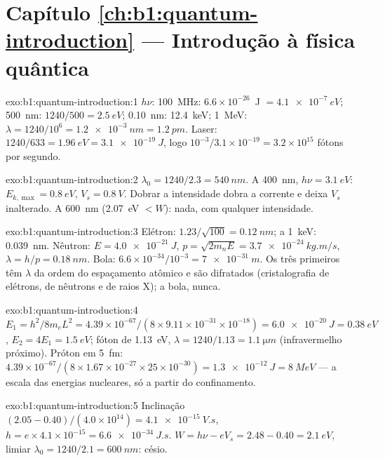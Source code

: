 \section*{Capítulo \ref{ch:b1:quantum-introduction} --- Introdução à física quântica}

\begin{solution}{exo:b1:quantum-introduction:1}
$h\nu$: \qty{100}{MHz}: $6.6 \times 10^{-26}$~J $= \qty{4.1e-7}{eV}$; \qty{500}{nm}:
$1240/500 = \qty{2.5}{eV}$; \qty{0.10}{nm}: \qty{12.4}{keV}; \qty{1}{MeV}: $\lambda =
1240/10^6 = \qty{1.2e-3}{nm} = \qty{1.2}{pm}$. Laser: $1240/633 = \qty{1.96}{eV} =
\qty{3.1e-19}{J}$, logo $10^{-3}/3.1 \times 10^{-19} = 3.2 \times 10^{15}$ fótons por
segundo.
\end{solution}

\begin{solution}{exo:b1:quantum-introduction:2}
$\lambda_0 = 1240/2.3 = \qty{540}{nm}$. A \qty{400}{nm}, $h\nu = \qty{3.1}{eV}$:
$E_{k,\max} = \qty{0.8}{eV}$, $V_s = \qty{0.8}{V}$. Dobrar a intensidade
dobra a corrente e deixa $V_s$ inalterado. A \qty{600}{nm}
(\qty{2.07}{eV} $< W$): nada, com qualquer intensidade.
\end{solution}

\begin{solution}{exo:b1:quantum-introduction:3}
Elétron: $1.23/\sqrt{100} = \qty{0.12}{nm}$; a \qty{1}{keV}: \qty{0.039}{nm}.
Nêutron: $E = \qty{4.0e-21}{J}$, $p = \sqrt{2m_nE} = \qty{3.7e-24}{kg.m/s}$,
$\lambda = h/p = \qty{0.18}{nm}$. Bola: $6.6 \times 10^{-34}/10^{-3} = \qty{7e-31}{m}$.
Os três primeiros têm $\lambda$ da ordem do espaçamento atômico e são
difratados (cristalografia de elétrons, de nêutrons e de raios X); a bola, nunca.
\end{solution}

\begin{solution}{exo:b1:quantum-introduction:4}
$E_1 = h^2/8m_eL^2 = 4.39 \times 10^{-67}/(8 \times 9.11 \times 10^{-31} \times 10^{-18}) =
\qty{6.0e-20}{J} = \qty{0.38}{eV}$, $E_2 = 4E_1 = \qty{1.5}{eV}$; fóton de
\qty{1.13}{eV}, $\lambda = 1240/1.13 = \qty{1.1}{\micro m}$ (infravermelho próximo). Próton
em \qty{5}{fm}: $4.39 \times 10^{-67}/(8 \times 1.67 \times 10^{-27} \times 25 \times 10^{-30}) =
\qty{1.3e-12}{J} = \qty{8}{MeV}$ --- a escala das energias nucleares, só a partir do
confinamento.
\end{solution}

\begin{solution}{exo:b1:quantum-introduction:5}
Inclinação $(2.05 - 0.40)/(4.0 \times 10^{14}) = \qty{4.1e-15}{V.s}$, $h = e \times 4.1 \times
10^{-15} = \qty{6.6e-34}{J.s}$. $W = h\nu - eV_s = 2.48 - 0.40 = \qty{2.1}{eV}$,
limiar $\lambda_0 = 1240/2.1 = \qty{600}{nm}$: césio.
\end{solution}

